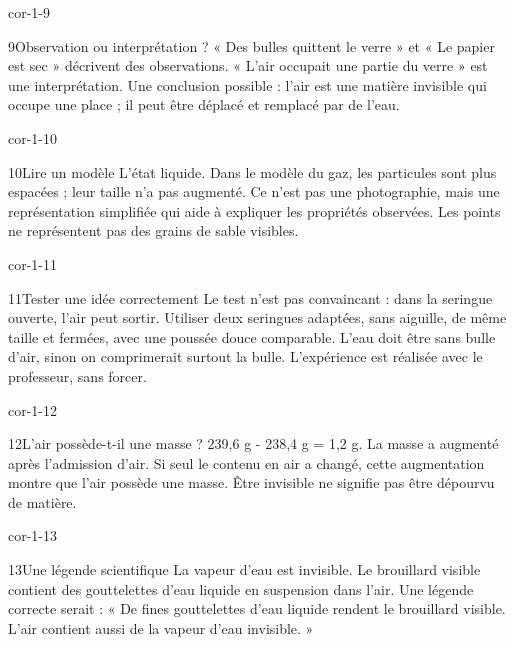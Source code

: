 \documentclass[12pt,twoside,openany]{book}
\begin{document}
\begin{blocLivre}{cor-1-9}
\begin{corrige}{9}{Observation ou interprétation ?}
« Des bulles quittent le verre » et « Le papier est sec » décrivent des observations. « L’air occupait une partie du verre » est une interprétation. Une conclusion possible : l’air est une matière invisible qui occupe une place ; il peut être déplacé et remplacé par de l’eau.\par
\end{corrige}\end{blocLivre}
\begin{blocLivre}{cor-1-10}
\begin{corrige}{10}{Lire un modèle}
L’état liquide. Dans le modèle du gaz, les particules sont plus espacées ; leur taille n’a pas augmenté. Ce n’est pas une photographie, mais une représentation simplifiée qui aide à expliquer les propriétés observées. Les points ne représentent pas des grains de sable visibles.\par
{}
\end{corrige}\end{blocLivre}
\begin{blocLivre}{cor-1-11}
\begin{corrige}{11}{Tester une idée correctement}
Le test n’est pas convaincant : dans la seringue ouverte, l’air peut sortir. Utiliser deux seringues adaptées, sans aiguille, de même taille et fermées, avec une poussée douce comparable. L’eau doit être sans bulle d’air, sinon on comprimerait surtout la bulle. L’expérience est réalisée avec le professeur, sans forcer.\par
\end{corrige}\end{blocLivre}
\clearpage
\begin{blocLivre}{cor-1-12}
\begin{corrige}{12}{L’air possède-t-il une masse ?}
239,6 g - 238,4 g = 1,2 g. La masse a augmenté après l’admission d’air. Si seul le contenu en air a changé, cette augmentation montre que l’air possède une masse. Être invisible ne signifie pas être dépourvu de matière.\par
\end{corrige}\end{blocLivre}
\begin{blocLivre}{cor-1-13}
\begin{corrige}{13}{Une légende scientifique}
La vapeur d’eau est invisible. Le brouillard visible contient des gouttelettes d’eau liquide en suspension dans l’air. Une légende correcte serait : « De fines gouttelettes d’eau liquide rendent le brouillard visible. L’air contient aussi de la vapeur d’eau invisible. »\par
\end{corrige}\end{blocLivre}
\end{document}

